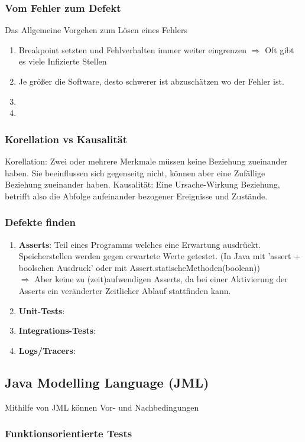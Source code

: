 \documentclass[a4paper,10pt]{scrartcl}
\begin{document}
\subsubsection{Vom Fehler zum Defekt}
Das Allgemeine Vorgehen zum Lösen eines Fehlers
\begin{enumerate}
    \item Breakpoint setzten und Fehlverhalten immer weiter eingrenzen
    $\Rightarrow$ Oft gibt es viele Infizierte Stellen
    \item Je größer die Software, desto schwerer ist abzuschätzen wo der Fehler ist.
    \item 
    \item 
\end{enumerate}
\subsubsection{Korellation vs Kausalität}
Korellation: Zwei oder mehrere Merkmale müssen keine Beziehung zueinander haben. Sie beeinflussen sich gegenseitg nicht, können aber eine Zufällige Beziehung zueinander haben.
Kausalität: Eine Ursache-Wirkung Beziehung, betrifft also die Abfolge aufeinander bezogener Ereignisse und Zustände.
\subsubsection{Defekte finden}
\begin{enumerate}
    \item \textbf{Asserts}: 
    Teil eines Programms welches eine Erwartung ausdrückt. Speicherstellen werden gegen erwartete Werte getestet. (In Java mit 'assert + boolschen Ausdruck' oder mit Assert.statischeMethoden(boolean))\\
    $\Rightarrow$ Aber keine zu (zeit)aufwendigen Asserts, da bei einer Aktivierung der Asserts ein veränderter Zeitlicher Ablauf stattfinden kann.
    \item \textbf{Unit-Tests}: 
    \item \textbf{Integrations-Tests}:
    \item \textbf{Logs/Tracers}:
\end{enumerate}
\subsection{Java Modelling Language (JML)}
Mithilfe von JML können Vor- und Nachbedingungen 

\subsubsection{Funktionsorientierte Tests}
\end{document}
